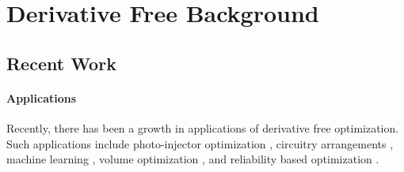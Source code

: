 \section{Derivative Free Background}
% 
% 
% 

\subsection{Recent Work}
\paragraph{Applications}

Recently, there has been a growth in applications of derivative free optimization.
Such applications include photo-injector optimization \cite{1742-6596-874-1-012062}, circuitry arrangements \cite{PLOSKAS201816}, machine learning \cite{KS2018}, volume optimization \cite{Cheng2017}, and reliability based optimization \cite{Gao2017}.

